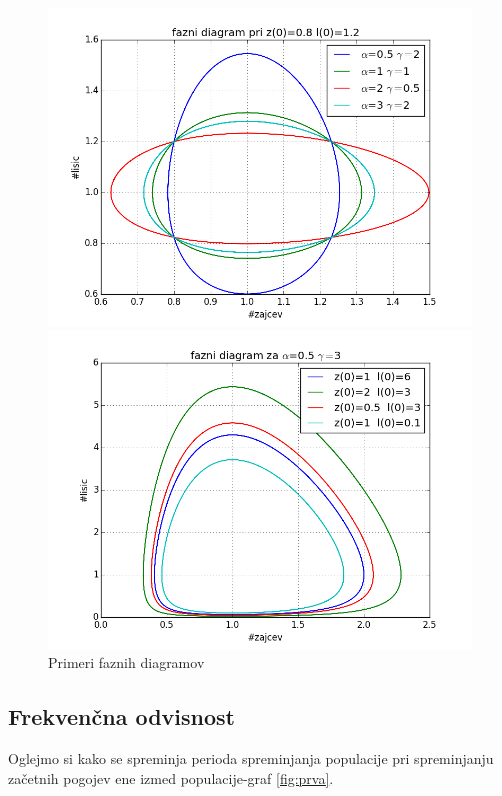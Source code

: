\documentclass[slovene,11pt,a4paper]{article}
\numberwithin{equation}{section} %
\numberwithin{figure}{section} %
\numberwithin{table}{section} %
\begin{document}
\begin{figure}[t!]
{\begin{minipage}[t]{0.5\paperwidth}
\begin{flushleft}
\includegraphics[scale=0.4]{slike/fazni-diagram-konstantni-zacetni-pogoji.png}
\hspace{\fill}
\end{flushleft}
\end{minipage}
\begin{minipage}[t]{0.5\paperwidth}
\includegraphics[scale=0.4]{slike/fazni-diagram-konstantna-alfa-gama.png}
\end{minipage}%
}
\caption{Primeri faznih diagramov}
\end{figure}


\subsection{Frekvenčna odvisnost}
Oglejmo si kako se spreminja perioda spreminjanja populacije pri spreminjanju začetnih pogojev ene izmed populacije-graf \ref{fig:prva}.
\end{document}
